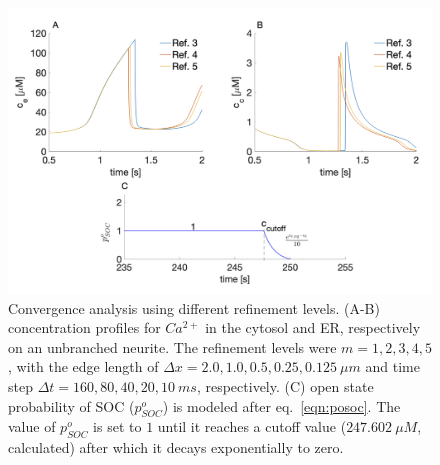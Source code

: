 \documentclass[review,supplement,onefignum,onetabnum]{siamart190516}
\begin{document}
\maketitle


\begin{figure}[!h]\label{fig:dxdt_posoc}
    \centering
    \includegraphics[width=12cm]{Figures/dxdt_posoc.png}
    \caption{Convergence analysis using different refinement levels. (A-B) concentration profiles for $Ca^{2+}$ in the cytosol and ER, respectively on an unbranched neurite. The refinement levels were $m=1,2,3,4,5$, with the edge length of $\Delta x = 2.0, 1.0, 0.5, 0.25, 0.125 ~\mu m$ and time step $\Delta t = 160, 80, 40, 20, 10~ms$, respectively. (C) open state probability of SOC ($p^o_{SOC}$) is modeled after eq.~\cref{eqn:posoc}. The value of $p^o_{SOC}$ is set to $1$ until it reaches a cutoff value ($247.602~\mu M$, calculated) after which it decays exponentially to zero.}
\end{figure}
\end{document}
